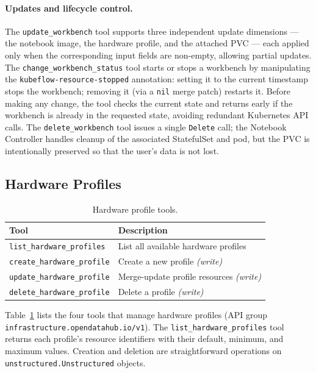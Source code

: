 \documentclass[
  digital,     %
  oneside,     %
  nosansbold,  %
  nocolorbold, %
  lof,         %
  lot,         %
]{fithesis4}
\begin{document}
\paragraph{Updates and lifecycle control.}
The \texttt{update\_workbench} tool supports three independent update
dimensions --- the notebook image, the hardware profile, and the attached
PVC --- each applied only when the corresponding input fields are
non-empty, allowing partial updates. The
\texttt{change\_workbench\_status} tool starts or stops a workbench by
manipulating the \texttt{kubeflow-resource-stopped} annotation: setting it
to the current timestamp stops the workbench; removing it (via a
\texttt{nil} merge patch) restarts it. Before making any change, the
tool checks the current state and returns early if the workbench is
already in the requested state, avoiding redundant Kubernetes API calls.
The \texttt{delete\_workbench} tool issues a single \texttt{Delete} call;
the Notebook Controller handles cleanup of the associated StatefulSet and
pod, but the PVC is intentionally preserved so that the user's data is
not lost.

\subsection{Hardware Profiles}
\label{subsec:hardware-tools}

\begin{table}[!htbp]
\caption{Hardware profile tools.}
\label{tab:tools-hw}
\small
\begin{tabularx}{\textwidth}{lX}
\toprule
\textbf{Tool} & \textbf{Description} \\
\midrule
\texttt{list\_hardware\_profiles}    & List all available hardware profiles \\
\texttt{create\_hardware\_profile}   & Create a new profile \textit{(write)} \\
\texttt{update\_hardware\_profile}   & Merge-update profile resources \textit{(write)} \\
\texttt{delete\_hardware\_profile}   & Delete a profile \textit{(write)} \\
\bottomrule
\end{tabularx}
\end{table}

Table~\ref{tab:tools-hw} lists the four tools that manage hardware profiles
(API group
\texttt{infrastructure.opendatahub.io/\allowbreak v1}). The
\texttt{list\_hardware\_profiles} tool returns each profile's resource
identifiers with their default, minimum, and maximum values. Creation and
deletion are straightforward operations on
\texttt{unstructured.Unstructured} objects.
\end{document}
